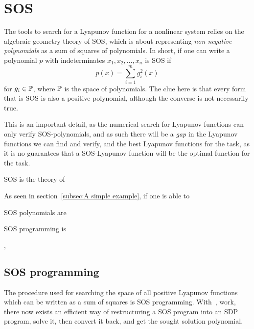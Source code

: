 \section{SOS}

The tools to search for a Lyapunov function for a nonlinear system relies on the
algebraic geometry theory of \ac{SOS}, which is about representing
\textit{non-negative polynomials} as a sum of squares of polynomials. In short,
if one can write a polynomial \(p\) with indeterminates \(x_1,x_2,\ldots,x_n\)
is \ac{SOS} if
\[
  p(x) = \sum_{i=1}^{m}g_i^2(x)
\]
for \(g_i \in \P\), where \(\P\) is the space of polynomials. The clue here is
that every form that is \ac{SOS} is also a positive polynomial, although the
converse is not necessarily true\cite{majumdarFunnelLibrariesRealTime2016}.

This is an important detail, as the numerical search for Lyapunov functions can
only verify \ac{SOS}-polynomials, and as such there will be a \textit{gap} in
the Lyapunov functions we can find and verify, and the best Lyapunov functions
for the task, as it is no guarantees that a \ac{SOS}-Lyapunov function will be
the optimal function for the task.

\ac{SOS} is the theory of

As seen in section~\ref{subsec:A simple example}, if one is able to

\acl{SOS} polynomials are

\acl{SOS} programming is

\cite{parilloStructuredSemidefinitePrograms},

\subsection{SOS programming}

The procedure used for searching the space of all positive Lyapunov functions
which can be written as a sum of squares is \ac{SOS} programming.
With~\cite[Parillo's]{parilloStructuredSemidefinitePrograms}, work, there now
exists an efficient way of restructuring a \ac{SOS} program into an \ac{SDP}
program, solve it, then convert it back, and get the sought solution polynomial.

